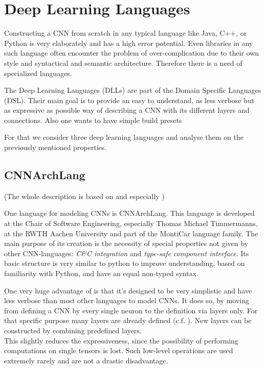 \chapter{Deep Learning Languages}\label{chapter: DLL}

Constructing a CNN from scratch in any typical language like Java, C++, or Python is very elaborately and has a high error potential. Even libraries in any such language often encounter the problem of over-complication due to their own style and syntactical and semantic architecture. Therefore there is a need of specialized languages.

The Deep Learning Languages (DLLs) are part of the Domain Specific Languages (DSL). Their main goal is to provide an easy to understand, as less verbose but as expressive as possible way of describing a CNN with its different layers and connections. Also one wants to have simple build presets

For that we consider three deep learning languages and analyse them on the previously mentioned properties.

\section{CNNArchLang}\label{sec: CNNArch}

(The whole description is based on\cite{CNNArch} and especially \cite{tim2018CNNArchLang})

One language for modeling CNNs is CNNArchLang. This language is developed at the Chair of Software Engineering, especially Thomas Michael Timmermanns,  at the RWTH Aachen University and part of the MontiCar language family. The main purpose of its creation is the necessity of special properties not given by other CNN-languages: \textit{C\&C integration} and \textit{type-safe component interface}. Its basic structure is very similar to python to improve understanding, based on familiarity with Python, and have an equal non-typed syntax. 

One very huge advantage of \cnnarch is that it's designed to be very simplistic and have less verbose than most other languages to model CNNs. It does so, by moving from defining a CNN by every single neuron to the definition via layers only. For that specific purpose many layers are already defined (c.f. ). 
New layers can be constructed by combining predefined layers.\\
This slightly reduces the expressiveness, since the possibility of performing computations on single tensors is lost. Such low-level operations are used extremely rarely and are not a drastic disadvantage.


